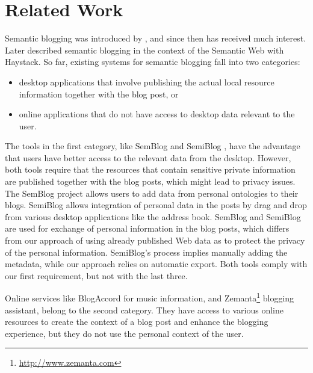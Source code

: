 \section{Related Work}
\label{sec:relatedworksemblog}

Semantic blogging was introduced by \cite{Cayzer2003}, and since then has received much interest. Later \cite{Karger2004} described semantic blogging in the context of the Semantic Web with Haystack. So far, existing systems for semantic blogging fall into two categories: 
\begin{itemize}
 \item desktop applications that involve publishing the actual local resource information together with the blog post, or
 \item online applications that do not have access to desktop data relevant to the user. 
\end{itemize}

The tools in the first category, like SemBlog \cite{Takeda2005} and SemiBlog \cite{Moeller2005}, have the advantage that users have better access to the relevant data from the desktop. However, both tools require that the resources that contain sensitive private information are published together with the blog posts, which might lead to privacy issues. The SemBlog project allows users to add data from personal ontologies to their blogs. SemiBlog allows integration of personal data in the posts by drag and drop from various desktop applications like the address book. SemBlog and SemiBlog are used for exchange of personal information in the blog posts, which differs from our approach of using already published Web data as to protect the privacy of the personal information. SemiBlog's process implies manually adding the metadata, while our approach relies on automatic export. Both tools comply with our first requirement, but not with the last three.

Online services like BlogAccord \cite{Cayzer2006} for music information, and Zemanta\footnote{\url{http://www.zemanta.com}} blogging assistant, belong to the second category. They have access to various online resources to create the context of a blog post and enhance the blogging experience, but they do not use the personal context of the user.

